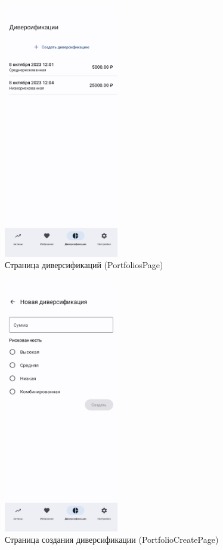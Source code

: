 \documentclass[a4paper, 14pt]{article}
\begin{document}
\begin{figure}[H]
    \centering
    \includegraphics[width=5cm]{resources/10.png}
    \caption{Страница диверсификаций (PortfoliosPage)}
\end{figure}

\begin{figure}[H]
    \centering
    \includegraphics[width=5cm]{resources/11.png}
    \caption{Страница создания диверсификации (PortfolioCreatePage)}
\end{figure}
\end{document}
